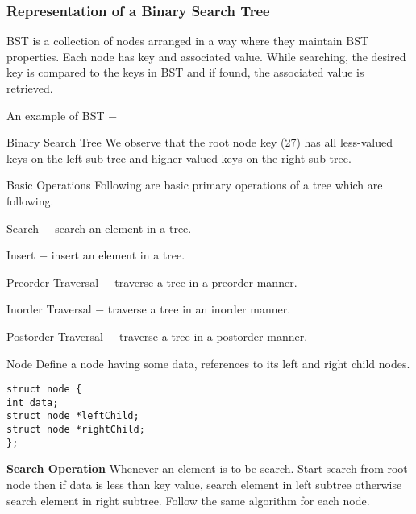\documentclass{beamer}
\begin{document}
\begin{frame}
\frametitle{Representation of a Binary Search Tree}
\large

BST is a collection of nodes arranged in a way where they maintain BST properties. Each node has key and associated value. While searching, the desired key is compared to the keys in BST and if found, the associated value is retrieved.

An example of BST −
\end{frame}
\begin{frame}
Binary Search Tree
We observe that the root node key (27) has all less-valued keys on the left sub-tree and higher valued keys on the right sub-tree.

Basic Operations
Following are basic primary operations of a tree which are following.

Search − search an element in a tree.

Insert − insert an element in a tree.

Preorder Traversal − traverse a tree in a preorder manner.

Inorder Traversal − traverse a tree in an inorder manner.

Postorder Traversal − traverse a tree in a postorder manner.
\end{frame}
\begin{frame}[fragile]
Node
Define a node having some data, references to its left and right child nodes.
\begin{verbatim}
struct node {
int data;   
struct node *leftChild;
struct node *rightChild;
};
\end{verbatim}

\end{frame}
\begin{frame}
\noindent \textbf{Search Operation}
Whenever an element is to be search. Start search from root node then if data is less than key value, search element in left subtree otherwise search element in right subtree. Follow the same algorithm for each node.
\end{frame}
%	
%	
%			
%			
\end{document}
